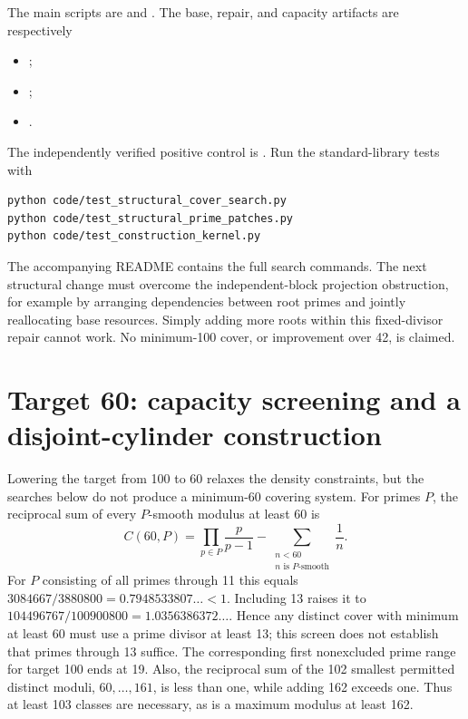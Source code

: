 \documentclass[11pt]{article}
\begin{document}
The main scripts are  and
. The base, repair, and capacity
artifacts are respectively
\begin{itemize}
\item {};
\item {};
\item {}.
\end{itemize}
The independently verified positive control is
.
Run the standard-library tests with
\begin{verbatim}
python code/test_structural_cover_search.py
python code/test_structural_prime_patches.py
python code/test_construction_kernel.py
\end{verbatim}
The accompanying README contains the full search commands. The next
structural change must overcome the independent-block projection
obstruction, for example by arranging dependencies between root primes
and jointly reallocating base resources. Simply adding more roots within
this fixed-divisor repair cannot work. No minimum-100 cover, or
improvement over 42, is claimed.

\section{Target 60: capacity screening and a disjoint-cylinder construction}
\label{sec:structural60}

Lowering the target from 100 to 60 relaxes the density constraints, but
the searches below do not produce a minimum-60 covering system.
For primes $P$, the reciprocal sum of every $P$-smooth modulus at least 60 is
\[
 C(60,P)=\prod_{p\in P}\frac{p}{p-1}
       -\sum_{\substack{n<60\\n\text{ is }P\text{-smooth}}}\frac1n.
\]
For $P$ consisting of all primes through 11 this equals
$3084667/3880800=0.7948533807\ldots<1$. Including 13 raises it to
$104496767/100900800=1.0356386372\ldots$. Hence any distinct cover with
minimum at least 60 must use a prime divisor at least 13; this screen
does not establish that primes through 13 suffice. The corresponding
first nonexcluded prime range for target 100 ends at 19.
Also, the reciprocal sum of the 102 smallest permitted distinct moduli,
$60,\ldots,161$, is less than one, while adding 162 exceeds one.
Thus at least 103 classes are necessary, as is a maximum modulus at least 162.
\end{document}
